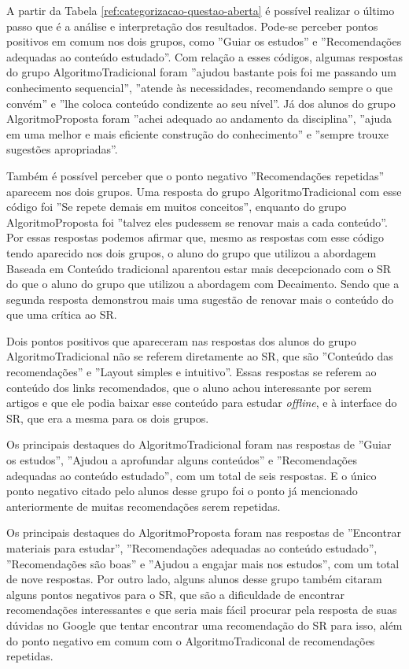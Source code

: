 A partir da Tabela \ref{ref:categorizacao-questao-aberta} é possível realizar o último passo que é a análise e interpretação
dos resultados. Pode-se perceber pontos positivos em comum nos dois grupos, como ''Guiar os estudos'' e ''Recomendações adequadas ao conteúdo estudado''.
Com relação a esses códigos, algumas respostas do grupo AlgoritmoTradicional foram ''ajudou bastante pois foi me passando um conhecimento sequencial'',
''atende às necessidades, recomendando sempre o que convém'' e ''lhe coloca conteúdo condizente ao seu nível''.
Já dos alunos do grupo AlgoritmoProposta foram ''achei adequado ao andamento da disciplina'',
''ajuda em uma melhor e mais eficiente construção do conhecimento'' e ''sempre trouxe sugestões apropriadas''.

Também é possível perceber que o ponto negativo ''Recomendações repetidas'' aparecem nos dois grupos. Uma resposta do grupo
AlgoritmoTradicional com esse código foi ''Se repete demais em muitos conceitos'', enquanto do grupo AlgoritmoProposta
foi ''talvez eles pudessem se renovar mais a cada conteúdo''. Por essas respostas podemos afirmar que, mesmo
as respostas com esse código tendo aparecido nos dois grupos, o aluno do grupo que utilizou a abordagem Baseada em Conteúdo
tradicional aparentou estar mais decepcionado com o SR do que o aluno do grupo que utilizou a abordagem com Decaimento.
Sendo que a segunda resposta demonstrou mais uma sugestão de renovar mais o conteúdo do que uma crítica ao SR.

Dois pontos positivos que apareceram nas respostas dos alunos do grupo AlgoritmoTradicional não se referem diretamente
ao SR, que são ''Conteúdo das recomendações'' e ''Layout simples e intuitivo''. Essas respostas se referem ao conteúdo
dos links recomendados, que o aluno achou interessante por serem artigos e que ele podia baixar esse conteúdo para estudar
\textit{offline}, e à interface do SR, que era a mesma para os dois grupos.

Os principais destaques do AlgoritmoTradicional foram nas respostas de ''Guiar os estudos'',
''Ajudou a aprofundar alguns conteúdos'' e ''Recomendações adequadas ao conteúdo estudado'',
com um total de seis respostas. E o único ponto negativo citado pelo alunos desse grupo foi o ponto já mencionado
anteriormente de muitas recomendações serem repetidas.

Os principais destaques do AlgoritmoProposta foram nas respostas de ''Encontrar materiais para estudar'',
''Recomendações adequadas ao conteúdo estudado'', ''Recomendações são boas'' e ''Ajudou a engajar mais nos estudos'',
com um total de nove respostas. Por outro lado, alguns alunos desse grupo também citaram alguns pontos negativos para o
SR, que são a dificuldade de encontrar recomendações interessantes e que seria mais fácil procurar pela resposta de
suas dúvidas no Google que tentar encontrar uma recomendação do SR para isso, além do ponto negativo em comum com o
AlgoritmoTradiconal de recomendações repetidas.

